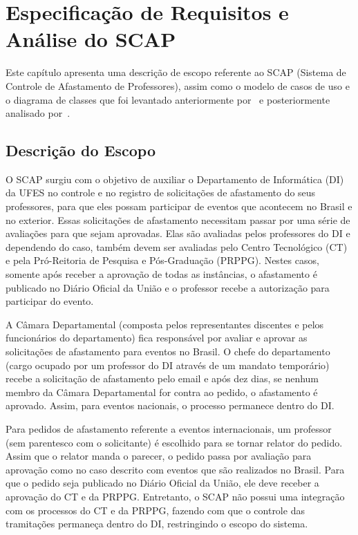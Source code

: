 \chapter{Especificação de Requisitos e Análise do SCAP}
\label{sec-requisitos}

Este capítulo apresenta uma descrição de escopo referente ao SCAP (Sistema de Controle de Afastamento de Professores), assim como o modelo de casos de uso e o diagrama de classes que foi levantado anteriormente por~ e posteriormente analisado por~. 

\section{Descrição do Escopo}
\label{sec-requisitos-descricao-escopo}

O SCAP surgiu com o objetivo de auxiliar o Departamento de Informática (DI) da UFES no controle e no registro de solicitações de afastamento do seus professores, para que eles possam participar de eventos que acontecem no Brasil e no exterior. Essas solicitações de afastamento necessitam passar por uma série de avaliações para que sejam aprovadas. Elas são avaliadas pelos professores do DI e dependendo do caso, também devem ser avaliadas pelo Centro Tecnológico (CT) e pela Pró-Reitoria de Pesquisa e Pós-Graduação (PRPPG). Nestes casos, somente após receber a aprovação de todas as instâncias, o afastamento é publicado no Diário Oficial da União e o professor recebe a autorização para participar do evento.     

A Câmara Departamental (composta pelos representantes discentes e pelos funcionários do departamento) fica responsável por avaliar e aprovar as solicitações de afastamento para eventos no Brasil. O chefe do departamento (cargo ocupado por um professor do DI através de um mandato temporário) recebe a solicitação de afastamento pelo email e após dez dias, se nenhum membro da Câmara Departamental for contra ao pedido, o afastamento é aprovado. Assim, para eventos nacionais, o processo permanece dentro do DI.

Para pedidos de afastamento referente a eventos internacionais, um professor (sem parentesco com o solicitante) é escolhido para se tornar relator do pedido. Assim que o relator manda o parecer, o pedido passa por avaliação para aprovação como no caso descrito com eventos que são realizados no Brasil. Para que o pedido seja publicado no Diário Oficial da União, ele deve receber a aprovação do CT e da PRPPG. Entretanto, o SCAP não possui uma integração com os processos do CT e da PRPPG, fazendo com que o controle das tramitações permaneça dentro do DI, restringindo o escopo do sistema.

